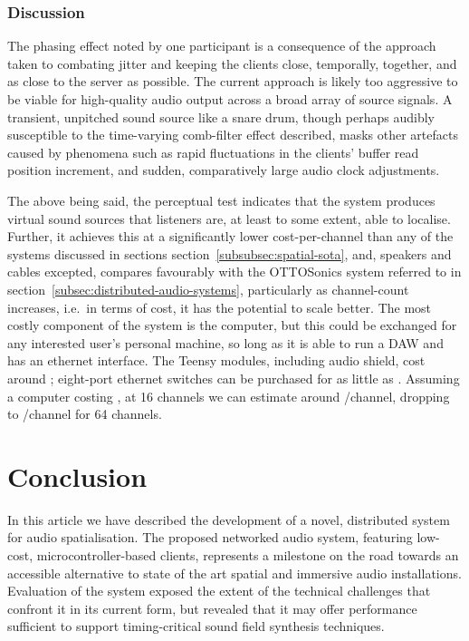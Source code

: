 \documentclass[utf8]{FrontiersinHarvard}
\newcommand{\secref}[1]{section~\ref{#1}}
\begin{document}
    \subsubsection{Discussion}\label{subsubsec:discussion-percep}

    The phasing effect noted by one participant is a consequence of the approach
    taken to combating jitter and keeping the clients close, temporally, together,
    and as close to the server as possible.
    The current approach is likely too aggressive to be viable for high-quality
    audio output across a broad array of source signals.
    A transient, unpitched sound source like a snare drum, though perhaps
    audibly susceptible to the time-varying comb-filter effect described, masks
    other artefacts caused by phenomena such as rapid fluctuations in the
    clients' buffer read position increment, and sudden, comparatively large
    audio clock adjustments.

    The above being said, the perceptual test indicates that the system produces
    virtual sound sources that listeners are, at least to some extent, able to
    localise.
    Further, it achieves this at a significantly lower cost-per-channel than any of
    the systems discussed in sections \secref{subsubsec:spatial-sota}, and, speakers
    and cables excepted, compares favourably with the OTTOSonics system referred to
    in \secref{subsec:distributed-audio-systems}, particularly as channel-count
    increases, i.e.\ in terms of cost, it has the potential to scale better.
    The most costly component of the system is the computer, but this could be
    exchanged for any interested user's personal machine, so long as it is able to
    run a DAW and has an ethernet interface.
    The Teensy modules, including audio shield, cost around ;
    eight-port ethernet switches can be purchased for as little as .
    Assuming a computer costing , at 16 channels we can estimate
    around /channel, dropping to /channel for 64
    channels.

    \section{Conclusion}\label{sec:conclusion}

    In this article we have described the development of a novel, distributed
    system for audio spatialisation.
    The proposed networked audio system, featuring low-cost,
    microcontroller-based clients, represents a milestone on the road towards an
    accessible alternative to state of the art spatial and immersive audio
    installations.
    Evaluation of the system exposed the extent of the technical challenges
    that confront it in its current form, but revealed that it may offer
    performance sufficient to support timing-critical sound field synthesis
    techniques.
\end{document}

